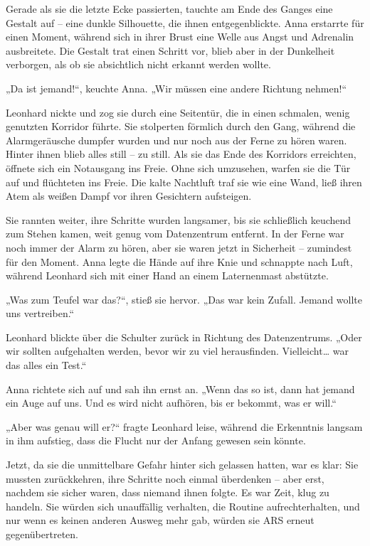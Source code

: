 \documentclass[
]{article}
\begin{document}
Gerade als sie die letzte Ecke passierten, tauchte am Ende des Ganges
eine Gestalt auf -- eine dunkle Silhouette, die ihnen entgegenblickte.
Anna erstarrte für einen Moment, während sich in ihrer Brust eine Welle
aus Angst und Adrenalin ausbreitete. Die Gestalt trat einen Schritt vor,
blieb aber in der Dunkelheit verborgen, als ob sie absichtlich nicht
erkannt werden wollte.

„Da ist jemand!{\kern0pt}``, keuchte Anna. „Wir müssen eine andere
Richtung nehmen!{\kern0pt}``

Leonhard nickte und zog sie durch eine Seitentür, die in einen schmalen,
wenig genutzten Korridor führte. Sie stolperten förmlich durch den Gang,
während die Alarmgeräusche dumpfer wurden und nur noch aus der Ferne zu
hören waren. Hinter ihnen blieb alles still -- zu still. Als sie das
Ende des Korridors erreichten, öffnete sich ein Notausgang ins Freie.
Ohne sich umzusehen, warfen sie die Tür auf und flüchteten ins Freie.
Die kalte Nachtluft traf sie wie eine Wand, ließ ihren Atem als weißen
Dampf vor ihren Gesichtern aufsteigen.

Sie rannten weiter, ihre Schritte wurden langsamer, bis sie schließlich
keuchend zum Stehen kamen, weit genug vom Datenzentrum entfernt. In der
Ferne war noch immer der Alarm zu hören, aber sie waren jetzt in
Sicherheit -- zumindest für den Moment. Anna legte die Hände auf ihre
Knie und schnappte nach Luft, während Leonhard sich mit einer Hand an
einem Laternenmast abstützte.

„Was zum Teufel war das?{\kern0pt}``, stieß sie hervor. „Das war kein
Zufall. Jemand wollte uns vertreiben.``

Leonhard blickte über die Schulter zurück in Richtung des Datenzentrums.
„Oder wir sollten aufgehalten werden, bevor wir zu viel herausfinden.
Vielleicht\ldots{} war das alles ein Test.``

Anna richtete sich auf und sah ihn ernst an. „Wenn das so ist, dann hat
jemand ein Auge auf uns. Und es wird nicht aufhören, bis er bekommt, was
er will.``

„Aber was genau will er?{\kern0pt}`` fragte Leonhard leise, während die
Erkenntnis langsam in ihm aufstieg, dass die Flucht nur der Anfang
gewesen sein könnte.

Jetzt, da sie die unmittelbare Gefahr hinter sich gelassen hatten, war
es klar: Sie mussten zurückkehren, ihre Schritte noch einmal überdenken
-- aber erst, nachdem sie sicher waren, dass niemand ihnen folgte. Es
war Zeit, klug zu handeln. Sie würden sich unauffällig verhalten, die
Routine aufrechterhalten, und nur wenn es keinen anderen Ausweg mehr
gab, würden sie ARS erneut gegenübertreten.
\end{document}
